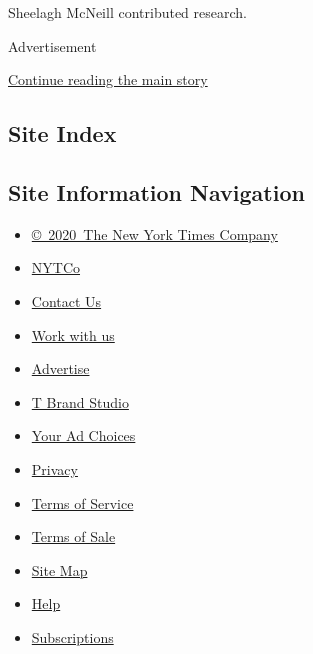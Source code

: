 Sheelagh McNeill contributed research.

Advertisement

\protect\hyperlink{after-bottom}{Continue reading the main story}

\hypertarget{site-index}{%
\subsection{Site Index}\label{site-index}}

\hypertarget{site-information-navigation}{%
\subsection{Site Information
Navigation}\label{site-information-navigation}}

\begin{itemize}
\tightlist
\item
  \href{https://help.nytimes3xbfgragh.onion/hc/en-us/articles/115014792127-Copyright-notice}{©~2020~The
  New York Times Company}
\end{itemize}

\begin{itemize}
\tightlist
\item
  \href{https://www.nytco.com/}{NYTCo}
\item
  \href{https://help.nytimes3xbfgragh.onion/hc/en-us/articles/115015385887-Contact-Us}{Contact
  Us}
\item
  \href{https://www.nytco.com/careers/}{Work with us}
\item
  \href{https://nytmediakit.com/}{Advertise}
\item
  \href{http://www.tbrandstudio.com/}{T Brand Studio}
\item
  \href{https://www.nytimes3xbfgragh.onion/privacy/cookie-policy\#how-do-i-manage-trackers}{Your
  Ad Choices}
\item
  \href{https://www.nytimes3xbfgragh.onion/privacy}{Privacy}
\item
  \href{https://help.nytimes3xbfgragh.onion/hc/en-us/articles/115014893428-Terms-of-service}{Terms
  of Service}
\item
  \href{https://help.nytimes3xbfgragh.onion/hc/en-us/articles/115014893968-Terms-of-sale}{Terms
  of Sale}
\item
  \href{https://spiderbites.nytimes3xbfgragh.onion}{Site Map}
\item
  \href{https://help.nytimes3xbfgragh.onion/hc/en-us}{Help}
\item
  \href{https://www.nytimes3xbfgragh.onion/subscription?campaignId=37WXW}{Subscriptions}
\end{itemize}
